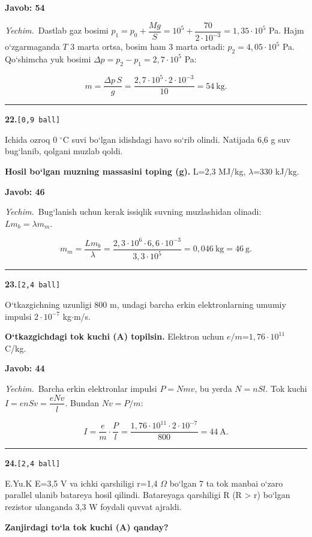 \documentclass[11pt,a4paper]{article}
\newcommand{\ball}[1]{\hfill\texttt{[#1 ball]}}
\newcommand{\qhead}[2]{\Needspace{10\baselineskip}\noindent\textbf{#1.}\ball{#2}\par\nopagebreak}
\newenvironment{qbody}{\begin{list}{}{\leftmargin=8mm\rightmargin=0pt\topsep=0pt\itemsep=0pt\parsep=3pt}\item\relax}{\end{list}}
\begin{document}
\noindent\colorbox{gray!12}{\parbox{\dimexpr\linewidth-2\fboxsep}{\textbf{Javob: 54}}}\par\smallskip
\noindent\textit{Yechim.}\ Dastlab gaz bosimi $p_1=p_0+\dfrac{Mg}{S}=10^5+\dfrac{70}{2\cdot10^{-3}}=1{,}35\cdot10^5$ Pa. Hajm o‘zgarmaganda $T$ 3 marta ortsa, bosim ham 3 marta ortadi: $p_2=4{,}05\cdot10^5$ Pa. Qo‘shimcha yuk bosimi $\Delta p=p_2-p_1=2{,}7\cdot10^5$ Pa:\par
\[m=\frac{\Delta p\,S}{g}=\frac{2{,}7\cdot10^5\cdot2\cdot10^{-3}}{10}=54\ \text{kg}.\]\par\medskip\hrule\medskip
\qhead{22}{0,9}
\begin{qbody}
Ichida ozroq 0 $^\circ$C suvi bo‘lgan idishdagi havo so‘rib olindi. Natijada 6,6 g suv bug‘lanib, qolgani muzlab qoldi.\par
\textbf{Hosil bo‘lgan muzning massasini toping (g).} L=2,3 MJ/kg, $\lambda$=330 kJ/kg.\par
\end{qbody}
\noindent\colorbox{gray!12}{\parbox{\dimexpr\linewidth-2\fboxsep}{\textbf{Javob: 46}}}\par\smallskip
\noindent\textit{Yechim.}\ Bug‘lanish uchun kerak issiqlik suvning muzlashidan olinadi: $Lm_b=\lambda m_m$.\par
\[m_m=\frac{Lm_b}{\lambda}=\frac{2{,}3\cdot10^6\cdot6{,}6\cdot10^{-3}}{3{,}3\cdot10^5}=0{,}046\ \text{kg}=46\ \text{g}.\]\par\medskip\hrule\medskip
\qhead{23}{2,4}
\begin{qbody}
O‘tkazgichning uzunligi 800 m, undagi barcha erkin elektronlarning umumiy impulsi $2\cdot10^{-7}$ kg$\cdot$m/s.\par
\textbf{O‘tkazgichdagi tok kuchi (A) topilsin.} Elektron uchun $e/m$=$1{,}76\cdot10^{11}$ C/kg.\par
\end{qbody}
\noindent\colorbox{gray!12}{\parbox{\dimexpr\linewidth-2\fboxsep}{\textbf{Javob: 44}}}\par\smallskip
\noindent\textit{Yechim.}\ Barcha erkin elektronlar impulsi $P=Nm v$, bu yerda $N=nSl$. Tok kuchi $I=enSv=\dfrac{eNv}{l}$. Bundan $Nv=P/m$:\par
\[I=\frac{e}{m}\cdot\frac{P}{l}=\frac{1{,}76\cdot10^{11}\cdot2\cdot10^{-7}}{800}=44\ \text{A}.\]\par\medskip\hrule\medskip
\qhead{24}{2,4}
\begin{qbody}
E.Yu.K E=3,5 V va ichki qarshiligi r=1,4 $\Omega$ bo‘lgan 7 ta tok manbai o‘zaro parallel ulanib batareya hosil qilindi. Batareyaga qarshiligi R (R \textgreater{} r) bo‘lgan rezistor ulanganda 3,3 W foydali quvvat ajraldi.\par
\textbf{Zanjirdagi to‘la tok kuchi (A) qanday?}\par
\end{qbody}
\end{document}

